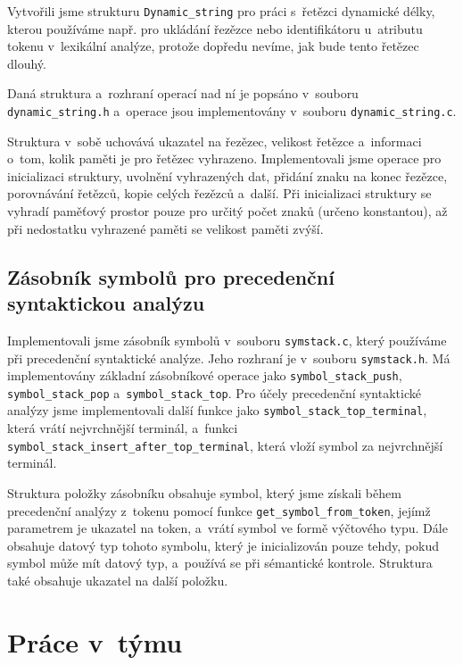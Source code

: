 \documentclass[a4paper, 11pt]{article}
\begin{document}
	Vytvořili jsme strukturu \texttt{Dynamic\_string} pro práci s~řetězci dynamické délky, kterou používáme
	např. pro ukládání řezězce nebo identifikátoru u~atributu tokenu v~lexikální analýze, protože dopředu nevíme,
	jak bude tento řetězec dlouhý.

	Daná struktura a~rozhraní operací nad ní je popsáno v~souboru \texttt{dynamic\_string.h} a~operace jsou implementovány
	v~souboru \texttt{dynamic\_string.c}.

	Struktura v~sobě uchovává ukazatel na řezězec, velikost řetězce a~informaci o~tom, kolik paměti je pro
	řetězec vyhrazeno. Implementovali jsme operace pro inicializaci struktury, uvolnění vyhrazených dat,
	přidání znaku na konec řezězce, porovnávání řetězců, kopie celých řezězců a~další. Při inicializaci struktury
	se vyhradí paměťový prostor pouze pro určitý počet znaků (určeno konstantou), až při nedostatku vyhrazené
	paměti se velikost paměti zvýší.


	\subsection{Zásobník symbolů pro precedenční syntaktickou analýzu}

	Implementovali jsme zásobník symbolů v~souboru \texttt{symstack.c}, který používáme při precedenční syntaktické analýze.
	Jeho rozhraní je v~souboru \texttt{symstack.h}. Má implementovány základní zásobníkové operace jako
	\texttt{symbol\_stack\_push}, \texttt{symbol\_stack\_pop} a~\texttt{symbol\_stack\_top}. Pro účely
	precedenční syntaktické analýzy jsme implementovali další funkce jako \texttt{symbol\_stack\_top\_terminal},
	která vrátí nejvrchnější terminál, a~funkci \texttt{symbol\_stack\_insert\_after\_top\_terminal},
	která vloží symbol za nejvrchnější terminál.

	Struktura položky zásobníku obsahuje symbol, který jsme získali během precedenční analýzy z~tokenu pomocí funkce
	\texttt{get\_symbol\_from\_token}, jejímž parametrem je ukazatel na token, a~vrátí symbol ve formě výčtového typu.
	Dále obsahuje datový typ tohoto symbolu, který je inicializován pouze tehdy, pokud symbol může mít datový typ,
	a~používá se při sémantické kontrole. Struktura také obsahuje ukazatel na další položku.



	\section{Práce v~týmu}
\end{document}
